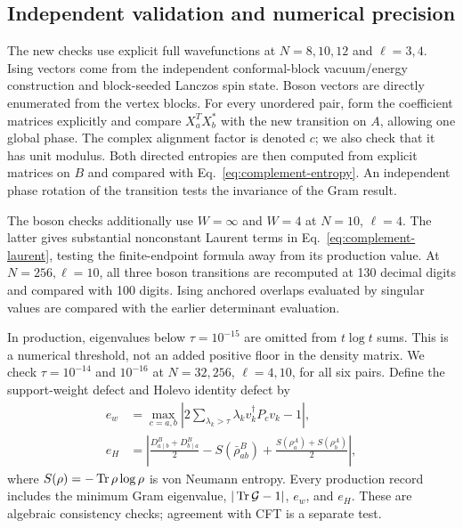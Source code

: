 \subsection{Independent validation and numerical precision}
The new checks use explicit full wavefunctions at $N=8,10,12$ and
$\ell=3,4$. Ising vectors come from the independent conformal-block
vacuum/energy construction and block-seeded Lanczos spin state.
Boson vectors are directly enumerated from the vertex blocks.
For every unordered pair, form the coefficient matrices explicitly
and compare $X_a^TX_b^*$ with the new transition on $A$,
allowing one global phase. The complex alignment factor is denoted $c$;
we also check that it has unit modulus.
Both directed entropies are then computed from explicit matrices on
$B$ and compared with Eq.~\eqref{eq:complement-entropy}.
An independent phase rotation of the transition tests the invariance
of the Gram result.

The boson checks additionally use $W=\infty$ and $W=4$ at $N=10$,
$\ell=4$. The latter gives substantial nonconstant Laurent terms in
Eq.~\eqref{eq:complement-laurent}, testing the finite-endpoint formula
away from its production value.
At $N=256,\ell=10$, all three boson transitions are recomputed at
130 decimal digits and compared with 100 digits.
Ising anchored overlaps evaluated by singular values are compared
with the earlier determinant evaluation.

In production, eigenvalues below $\tau=10^{-15}$ are omitted from
$t\log t$ sums. This is a numerical threshold, not an added positive
floor in the density matrix. We check $\tau=10^{-14}$ and $10^{-16}$
at $N=32,256$, $\ell=4,10$, for all six pairs.
Define the support-weight defect and Holevo identity defect by
\begin{align}
 e_w&=\max_{c=a,b}\left|
       2\sum_{\lambda_k>\tau}\lambda_k v_k^\dagger P_c v_k-1
       \right|,\nonumber\\
 e_H&=\left|\frac{D^B_{a\mid b}+D^B_{b\mid a}}2
       -S(\bar\rho_{ab}^B)+
         \frac{S(\rho_a^A)+S(\rho_b^A)}2\right|,
 \label{eq:complement-precision-metrics}
\end{align}
where $S(\rho)=-\operatorname{Tr}\rho\log\rho$ is von Neumann entropy.
Every production record includes the minimum Gram eigenvalue,
$|\operatorname{Tr}\mathcal G-1|$, $e_w$, and $e_H$. These are algebraic consistency
checks; agreement with CFT is a separate test.


